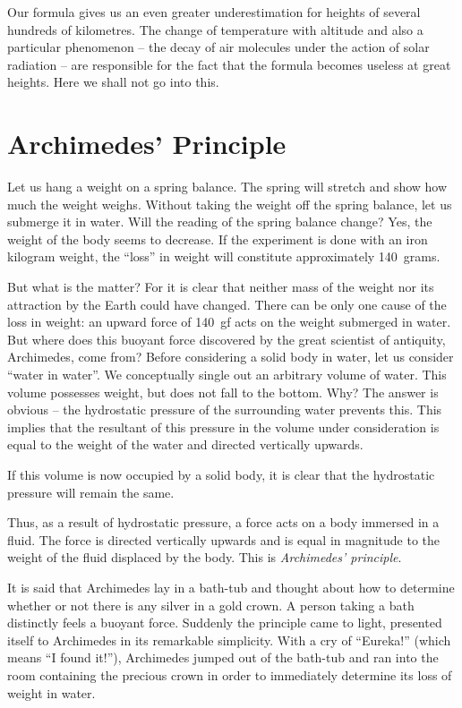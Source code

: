 Our formula gives us an even greater underestimation for heights of several hundreds of kilometres. The change of temperature with altitude and also a particular phenomenon -- the decay of air molecules under the action of solar radiation -- are responsible for the fact that the formula becomes useless at great heights. Here we shall not go into this.

\section{Archimedes' Principle}

Let us hang a weight on a spring balance. The spring will stretch and show how much the weight weighs. Without taking the weight off the spring balance, let us submerge it in water. Will the reading of the spring balance change? Yes, the weight of the body seems to decrease. If the experiment is done with an iron kilogram weight, the ``loss'' in weight will constitute approximately
140~grams.

But what is the matter? For it is clear that neither mass of the weight nor its attraction by the Earth could have changed. There can be only one cause of the loss in weight: an upward force of 140~gf acts on the weight submerged in water. But where does this buoyant force discovered by the great scientist of antiquity, Archimedes, come from? Before considering a solid body in water, let
us consider ``water in water''. We conceptually single out an arbitrary volume of water. This volume possesses
weight, but does not fall to the bottom. Why? The answer is obvious -- the hydrostatic pressure of the surrounding water prevents this. This implies that the resultant of this pressure in the volume under consideration is equal to the weight of the water and directed vertically upwards.

If this volume is now occupied by a solid body, it is clear that the hydrostatic pressure will remain the same.

Thus, as a result of hydrostatic pressure, a force acts on a body immersed in a fluid. The force is directed vertically upwards and is equal in magnitude to the weight of the fluid displaced by the body. This is \emph{Archimedes' principle}.

It is said that Archimedes lay in a bath-tub and thought about how to determine whether or not there is any silver in a gold crown. A person taking a bath distinctly feels a buoyant force. Suddenly the principle came to light, presented itself to Archimedes in its remarkable simplicity. With a cry of  ``Eureka!'' (which means ``I found it!''), Archimedes jumped out of the bath-tub and ran into
the room containing the precious crown in order to immediately determine its loss of weight in water.

